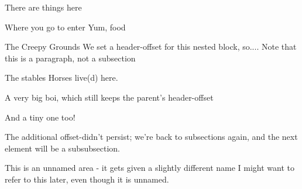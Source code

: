 \begin{RpgMap}[
        header-offset=1,%
        title={Example Map}
    ]

        There are things here

    \begin{RpgMap}[
        title={ignored-as-nested}
        ]
            Where you go to enter
            Yum, food
    \end{RpgMap}

    \begin{RpgNestedArea}[][header-offset=2]
        {The Creepy Grounds}
		We set a header-offset for this nested block, so....
            Note that this is a paragraph, not a subsection
         \begin{RpgNestedArea}{The stables}
            Horses live(d) here.
			
				A very big boi, which still keeps the parent's header-offset

				And a tiny one too!
		 \end{RpgNestedArea}
    \end{RpgNestedArea}

        The additional offset-didn't persist; we're back to subsections again, and the next element will be a subsubsection.

		\begin{RpgMap}[
			blank-prefix={Tomb~}
        	]
			\RpgArea{}
				This is an unnamed area - it gets given a slightly different name
				I might want to refer to this later, even though it is unnamed.
		\end{RpgMap}
\end{RpgMap}
